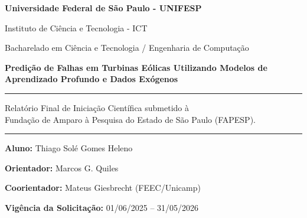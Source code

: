 \documentclass[12pt]{article}
\begin{document}
\begin{center}
\vspace*{1cm}
\Large
\textbf{Universidade Federal de São Paulo - UNIFESP}

\normalsize

Instituto de Ciência e Tecnologia - ICT

Bacharelado em Ciência e Tecnologia / Engenharia de Computação

\vspace*{\fill}

\Large

\textbf{Predição de Falhas em Turbinas Eólicas Utilizando Modelos de Aprendizado Profundo e Dados Exógenos}

\vspace{5mm}

\noindent\rule{\textwidth}{0.4pt}

\vspace{5mm}

\normalsize

Relatório Final de Iniciação Científica submetido à \\ Fundação de Amparo à Pesquisa do Estado de São Paulo (FAPESP).

\vspace{5mm}

\noindent\rule{\textwidth}{0.4pt}

\vspace{5mm}

\end{center}

\vspace*{\fill}

\normalsize

\vspace{0.5cm}

\begin{flushright}

\textbf{Aluno:} Thiago Solé Gomes Heleno

\textbf{Orientador:} Marcos G. Quiles

\textbf{Coorientador:} Mateus Giesbrecht (FEEC/Unicamp)

\vspace{10mm}

\centering \textbf{Vigência da Solicitação:} 01/06/2025 -- 31/05/2026

\end{flushright}

\vspace{5mm}
\end{document}
